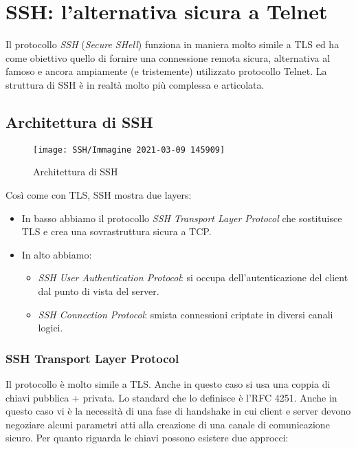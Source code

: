 \documentclass[14pt]{extreport}
\begin{document}
\chapter{SSH: l'alternativa sicura a Telnet}
Il protocollo \textit{SSH} (\textit{Secure SHell}) funziona in maniera molto simile a TLS ed ha come obiettivo quello di fornire una connessione remota sicura, alternativa al famoso e ancora ampiamente (e tristemente) utilizzato protocollo Telnet. La struttura di SSH è in realtà molto più complessa e articolata.

\section{Architettura di SSH}

\begin{figure}[H]
    \centering
    \texttt{[image: SSH/Immagine 2021-03-09 145909]}
    \caption{Architettura di SSH}
\end{figure}

Così come con TLS, SSH mostra due layers:


\begin{itemize}
    \item In basso abbiamo il protocollo \textit{SSH Transport Layer Protocol} che sostituisce TLS e crea una sovrastruttura sicura a TCP.
    
    \item In alto abbiamo:
    
    \begin{itemize}
        \item \textit{SSH User Authentication Protocol}: si occupa dell'autenticazione del client dal punto di vista del server.
        
        
        \item \textit{SSH Connection Protocol}: smista connessioni criptate in diversi canali logici.
    \end{itemize}
\end{itemize}




\subsection{SSH Transport Layer Protocol}
Il protocollo è molto simile a TLS. Anche in questo caso si usa una coppia di chiavi pubblica + privata. Lo standard che lo definisce è l'RFC 4251. Anche in questo caso vi è la necessità di una fase di handshake in cui client e server devono negoziare alcuni parametri atti alla creazione di una canale di comunicazione sicuro. Per quanto riguarda le chiavi possono esistere due approcci:
\end{document}
